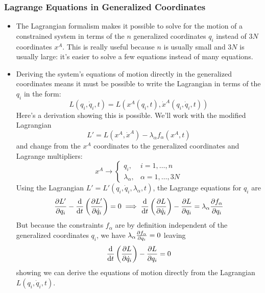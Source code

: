 \documentclass[11pt, a4paper]{article}
\begin{document}
\subsubsection{Lagrange Equations in Generalized Coordinates}
\begin{itemize}
	\item The Lagrangian formalism makes it possible to solve for the motion of a constrained system in terms of the $ n $ generalized coordinates $ q_{i} $ instead of $ 3N $ coordinates $ x^{A} $. This is really useful because $ n $ is usually small and $ 3N $ is usually large: it's easier to solve a few equations instead of many equations. 
	
	\item Deriving the system's equations of motion directly in the generalized coordinates means it must be possible to write the Lagrangian in terms of the $ q_{i} $ in the form:
	\begin{equation*}
		L(q_i, \dot{q}_i, t) = L\left (x^{A}(q_i, t), \dot{x}^{A}(q_i, \dot{q}_i, t)\right )
	\end{equation*}
	Here's a derivation showing this is possible. We'll work with the modified Lagrangian 
	\begin{equation*}
		L' = L(x^{A}, \dot{x}^{A}) - \lambda_{\alpha}f_{\alpha}(x^{A}, t) 
	\end{equation*}
	and change from the $ x^{A} $ coordinates to the generalized coordinates and Lagrange multipliers:
	\begin{equation*}
		x^{A} \to 
		\begin{cases}
			q_{i}, & i = 1, \ldots, n\\
			\lambda_{\alpha}, & \alpha = 1, \ldots, 3N
		\end{cases}
	\end{equation*}
	Using the Lagrangian $ L' = L'(q_{i}, \dot{q}_{i}, \lambda_{\alpha}, t) $, the Lagrange equations for $ q_{i} $ are
	\begin{equation*}
		\pdv{L'}{q_{i}} - \dv{}{t}\left(\pdv{L'}{\dot{q}_{i}} \right) = 0 \implies \dv{}{t} \left(\pdv{L}{\dot{q}_i} \right)- \pdv{L}{q_i} = \lambda_{\alpha} \pdv{f_{\alpha}}{q_i}
	\end{equation*}
	But because the constraints $ f_{\alpha} $ are by definition independent of the generalized coordinates $ q_{i} $, we have $ \lambda_{\alpha} \pdv{f_{\alpha}}{q_i} = 0 $ leaving
	\begin{equation*}
		 \dv{}{t} \left(\pdv{L}{\dot{q}_i} \right)- \pdv{L}{q_i} = 0
	\end{equation*}
	showing we can derive the equations of motion directly from the Lagrangian $ L(q_{i}, \dot{q}_{i}, t) $.
	
\end{itemize}
\end{document}
